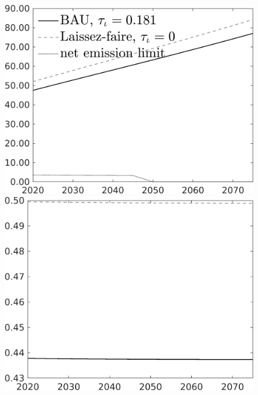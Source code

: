 \documentclass[12pt]{article}
\begin{document}
\begin{figure}[h!!]
\begin{minipage}[]{0.32\textwidth}
	\end{minipage}	
	\begin{minipage}[]{0.32\textwidth}
		\includegraphics[width=1\textwidth]{../../codding_model/own_basedOnFried/optimalPol_010922_revision/figures/all_13Sept22/CompTaul_Equlab_LFBAU_Reg0_Emnet_spillover0_nsk0_xgr1_knspil1_sep1_countec0_GovRev0_etaa0.79_lgd1.png}
	\end{minipage}	
	\begin{minipage}[]{0.32\textwidth}
		\includegraphics[width=1\textwidth]{../../codding_model/own_basedOnFried/optimalPol_010922_revision/figures/all_13Sept22/CompTaul_Equlab_LFBAU_Reg0_hh_spillover0_nsk0_xgr1_knspil1_sep1_countec0_GovRev0_etaa0.79_lgd0.png}

\end{minipage}
\end{figure}
\end{document}
